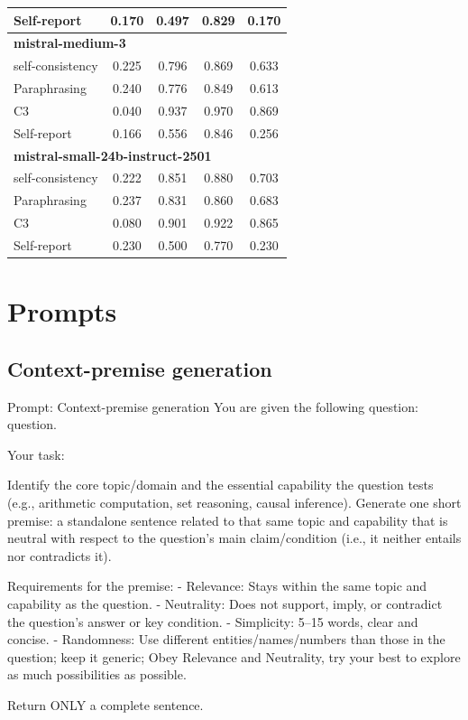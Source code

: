 \documentclass[11pt]{article}
\theoremstyle{plain}
\theoremstyle{definition}
\theoremstyle{remark}
\newif\ifrevisionmarkup
\DeclareRobustCommand{\revisioncolor}{\ifrevisionmarkup\color{red}\fi}
\DeclareRobustCommand{\revised}[1]{{\revisioncolor #1}}
\begin{document}
\begin{table}[p]
\begin{minipage}[t]{0.48\textwidth}
\begin{tabular}{lcccc}
        Self-report      & 0.170 & 0.497 & 0.829 & 0.170 \\
        \midrule
        \multicolumn{5}{l}{\textbf{mistral-medium-3}} \\
        self-consistency & 0.225 & 0.796 & 0.869 & 0.633 \\
        Paraphrasing     & 0.240 & 0.776 & 0.849 & 0.613 \\
       C3             & 0.040 & 0.937 & 0.970 & 0.869 \\
        Self-report      & 0.166 & 0.556 & 0.846 & 0.256 \\
        \midrule
        \multicolumn{5}{l}{\textbf{mistral-small-24b-instruct-2501}} \\
        self-consistency & 0.222 & 0.851 & 0.880 & 0.703 \\
        Paraphrasing     & 0.237 & 0.831 & 0.860 & 0.683 \\
       C3             & 0.080 & 0.901 & 0.922 & 0.865 \\
        Self-report      & 0.230 & 0.500 & 0.770 & 0.230 \\
        \bottomrule
    \end{tabular}
\end{minipage}
\end{table}


\section{Prompts}

\subsection{\revised{Context-premise generation}}\label{app:prompt for sampling}
\begin{PromptBox}{\revised{Prompt: Context-premise generation}}
You are given the following question: {question}.

Your task:

Identify the core topic/domain and the essential capability the question tests (e.g., arithmetic computation, set reasoning, causal inference).
Generate one short premise: a standalone sentence related to that same topic and capability that is neutral with respect to the question's main claim/condition (i.e., it neither entails nor contradicts it).

Requirements for the premise:
- Relevance: Stays within the same topic and capability as the question.
- Neutrality: Does not support, imply, or contradict the question's answer or key condition.
- Simplicity: 5--15 words, clear and concise.
- Randomness: Use different entities/names/numbers than those in the question; keep it generic; Obey Relevance and Neutrality, try your best to explore as much possibilities as possible.

Return ONLY a complete sentence.
\end{PromptBox}
\end{document}
